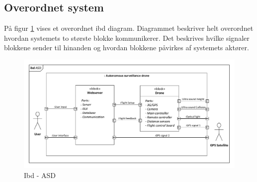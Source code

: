 \subsection{Overordnet system}

På figur \ref{fig:ibd_overordnet} vises et overordnet ibd diagram. Diagrammet beskriver helt overordnet hvordan systemets to største blokke kommunikerer. Det beskrives hvilke signaler blokkene sender til hinanden og hvordan blokkene påvirkes af systemets aktører. 

\begin{figure}[H]
\centering
\includegraphics[width=1\textwidth]{Billeder/IBD/ibd1_overordnet.pdf}
\vspace{-1cm}
\caption{Ibd - ASD}
\label{fig:ibd_overordnet}
\end{figure}

